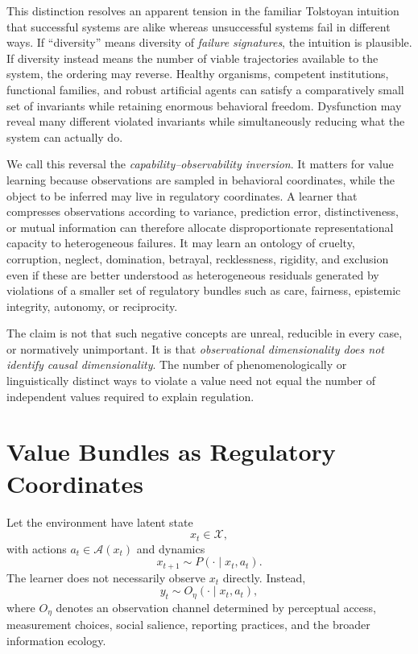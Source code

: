 \documentclass[11pt]{article}
\begin{document}
This distinction resolves an apparent tension in the familiar Tolstoyan intuition that successful systems are alike whereas unsuccessful systems fail in different ways. If ``diversity'' means diversity of \emph{failure signatures}, the intuition is plausible. If diversity instead means the number of viable trajectories available to the system, the ordering may reverse. Healthy organisms, competent institutions, functional families, and robust artificial agents can satisfy a comparatively small set of invariants while retaining enormous behavioral freedom. Dysfunction may reveal many different violated invariants while simultaneously reducing what the system can actually do.

We call this reversal the \emph{capability--observability inversion}. It matters for value learning because observations are sampled in behavioral coordinates, while the object to be inferred may live in regulatory coordinates. A learner that compresses observations according to variance, prediction error, distinctiveness, or mutual information can therefore allocate disproportionate representational capacity to heterogeneous failures. It may learn an ontology of cruelty, corruption, neglect, domination, betrayal, recklessness, rigidity, and exclusion even if these are better understood as heterogeneous residuals generated by violations of a smaller set of regulatory bundles such as care, fairness, epistemic integrity, autonomy, or reciprocity.

The claim is not that such negative concepts are unreal, reducible in every case, or normatively unimportant. It is that \emph{observational dimensionality does not identify causal dimensionality}. The number of phenomenologically or linguistically distinct ways to violate a value need not equal the number of independent values required to explain regulation.

\section{Value Bundles as Regulatory Coordinates}

Let the environment have latent state
\[
    x_t \in \mathcal{X},
\]
with actions $a_t\in\mathcal{A}(x_t)$ and dynamics
\[
    x_{t+1}\sim P(\cdot\mid x_t,a_t).
\]
The learner does not necessarily observe $x_t$ directly. Instead,
\[
    y_t\sim O_\eta(\cdot\mid x_t,a_t),
\]
where $O_\eta$ denotes an observation channel determined by perceptual access, measurement choices, social salience, reporting practices, and the broader information ecology.
\end{document}
